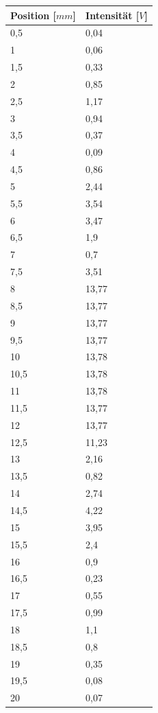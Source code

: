 \documentclass{scrartcl}
\begin{document}
\begin{table}[H]
\begin{center}
\begin{tabular}{l|l}
Position [$mm$]    & Intensität [$V$]  \\
\hline
0,5	&0,04 \\
1	&0,06\\
1,5	&0,33\\
2	&0,85\\
2,5	&1,17\\
3	&0,94\\
3,5	&0,37\\
4	&0,09\\
4,5	&0,86\\
5	&2,44\\
5,5	&3,54\\
6	&3,47\\
6,5	&1,9\\
7	&0,7\\
7,5	&3,51\\
8	&13,77\\
8,5	&13,77\\
9	&13,77\\
9,5	&13,77\\
10	&13,78\\
10,5&	13,78\\
11	&13,78\\
11,5&	13,77\\
12	&13,77\\
12,5&	11,23\\
13	&2,16\\
13,5&	0,82\\
14	&2,74\\
14,5&	4,22\\
15	&3,95\\
15,5&	2,4\\
16	&0,9\\
16,5&	0,23\\
17	&0,55\\
17,5&	0,99\\
18	&1,1\\
18,5&	0,8\\
19	&0,35\\
19,5&	0,08\\
20	&0,07\\
\end{tabular}
\end{center}
\label{tab:Spalt}
\end{table}
\end{document}
